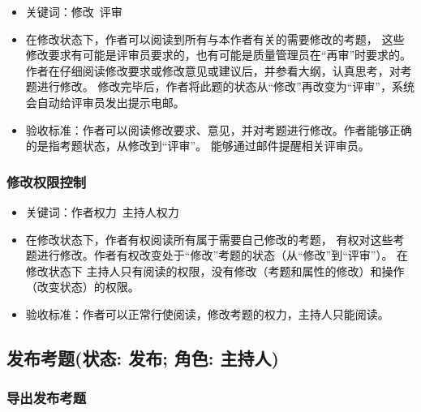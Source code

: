 \documentclass[hyperref, a4paper]{ctexart}
\providecommand{\tightlist}{%
  \setlength{\itemsep}{0pt}\setlength{\parskip}{0pt}}
\begin{document}
\begin{itemize}
\tightlist
\item
  关键词：修改~评审
\item
  在修改状态下，作者可以阅读到所有与本作者有关的需要修改的考题，
  这些修改要求有可能是评审员要求的，也有可能是质量管理员在``再审''时要求的。
  作者在仔细阅读修改要求或修改意见或建议后，并参看大纲，认真思考，对考题进行修改。
  修改完毕后，作者将此题的状态从``修改''再改变为``评审''，系统会自动给评审员发出提示电邮。
\item
  验收标准：作者可以阅读修改要求、意见，并对考题进行修改。作者能够正确的是指考题状态，从修改到``评审''。
  能够通过邮件提醒相关评审员。
\end{itemize}

\hypertarget{ux4feeux6539ux6743ux9650ux63a7ux5236}{%
\subsubsection{修改权限控制}\label{ux4feeux6539ux6743ux9650ux63a7ux5236}}

\begin{itemize}
\tightlist
\item
  关键词：作者权力~主持人权力
\item
  在修改状态下，作者有权阅读所有属于需要自己修改的考题，
  有权对这些考题进行修改。作者有权改变处于``修改''考题的状态（从``修改''到``评审''）。
  在修改状态下
  主持人只有阅读的权限，没有修改（考题和属性的修改）和操作（改变状态）的权限。
\item
  验收标准：作者可以正常行使阅读，修改考题的权力，主持人只能阅读。
\end{itemize}

\hypertarget{ux53d1ux5e03ux8003ux9898ux72b6ux6001-ux53d1ux5e03-ux89d2ux8272-ux4e3bux6301ux4eba}{%
\subsection{发布考题(状态: 发布; 角色:
主持人)}\label{ux53d1ux5e03ux8003ux9898ux72b6ux6001-ux53d1ux5e03-ux89d2ux8272-ux4e3bux6301ux4eba}}

\hypertarget{ux5bfcux51faux53d1ux5e03ux8003ux9898}{%
\subsubsection{导出发布考题}\label{ux5bfcux51faux53d1ux5e03ux8003ux9898}}
\end{document}
